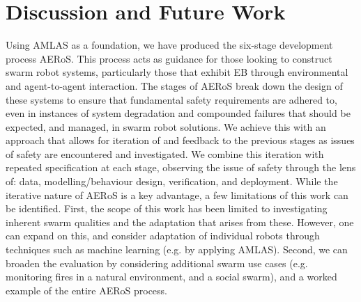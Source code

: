 \documentclass[runningheads]{llncs}
\begin{document}
\section{Discussion and Future Work} \label{discussion-conclusions}

Using AMLAS \cite{Hawkins2021} as a foundation, we have produced the six-stage development process AERoS. This process acts as guidance for those looking to construct swarm robot systems, particularly those that exhibit EB through environmental and agent-to-agent interaction. The stages of AERoS break down the design of these systems to ensure that fundamental safety requirements are adhered to, even in instances of system degradation and compounded failures that should be expected, and managed, in swarm robot solutions. We achieve this with an approach that allows for iteration of and feedback to the previous stages as issues of safety are encountered and investigated. We combine this iteration with repeated specification at each stage, observing the issue of safety through the lens of: data, modelling/behaviour design, verification, and deployment. 
While the iterative nature of AERoS is a key advantage, a few limitations of this work can be identified. 
First, the scope of this work has been limited to investigating inherent swarm qualities and the adaptation that arises from these. 
However, one can expand on this, and consider adaptation of individual robots through techniques such as machine learning (e.g. by applying AMLAS).
Second, we can broaden the evaluation by considering additional swarm use cases (e.g. monitoring fires in a natural environment, and a social swarm), and a worked example of the entire AERoS process.


\end{document}
